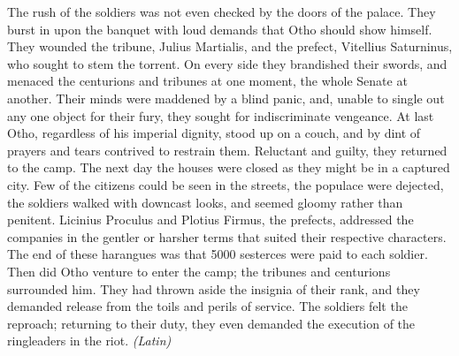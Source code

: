 The rush of the soldiers was not even checked by the doors of the palace. They burst in upon the banquet with loud demands that Otho should show himself. They wounded the tribune, Julius Martialis, and the prefect, Vitellius Saturninus, who sought to stem the torrent. On every side they brandished their swords, and menaced the centurions and tribunes at one moment, the whole Senate at another. Their minds were maddened by a blind panic, and, unable to single out any one object for their fury, they sought for indiscriminate vengeance. At last Otho, regardless of his imperial dignity, stood up on a couch, and by dint of prayers and tears contrived to restrain them. Reluctant and guilty, they returned to the camp. The next day the houses were closed as they might be in a captured city. Few of the citizens could be seen in the streets, the populace were dejected, the soldiers walked with downcast looks, and seemed gloomy rather than penitent. Licinius Proculus and Plotius Firmus, the prefects, addressed the companies in the gentler or harsher terms that suited their respective characters. The end of these harangues was that 5000 sesterces were paid to each soldier. Then did Otho venture to enter the camp; the tribunes and centurions surrounded him. They had thrown aside the insignia of their rank, and they demanded release from the toils and perils of service. The soldiers felt the reproach; returning to their duty, they even demanded the execution of the ringleaders in the riot. \emph{(Latin)}


